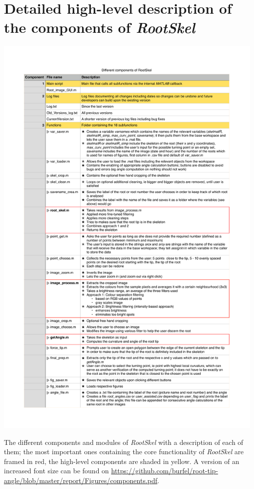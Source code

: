 

\chapter{Detailed high-level description of the components of \textit{RootSkel}}

\newpage
\begin{table}[H]
	\centering
	\includegraphics[width=1.\textwidth]{../Figures/components2.pdf}
	\caption{The different components and modules of \textit{RootSkel} with a description of each of them; the most important ones containing the core functionality of \textit{RootSkel} are framed in red, the high-level components are shaded in yellow. A version of an increased font size can be found on \url{https://github.com/burfel/root-tip-angle/blob/master/report/Figures/components.pdf}.}
	\label{table:modules}
\end{table}



